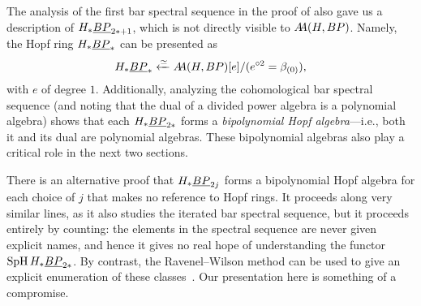\begin{remark}
The analysis of the first bar spectral sequence in the proof of  also gave us a description of \(H_* \OS{BP}{2*+1}\), which is not directly visible to \(\AA(H, BP)\).  Namely, the Hopf ring \(H_* \OS{BP}{*}\) can be presented as \[H_* \OS{BP}{*} \xleftarrow{\simeq} \AA(H, BP)[e] / (e^{\circ 2} = \beta_{(0)}),\] with \(e\) of degree \(1\).  Additionally, analyzing the cohomological bar spectral sequence (and noting that the dual of a divided power algebra is a polynomial algebra) shows that each \(H_* \OS{BP}{2*}\) forms a \textit{bipolynomial Hopf algebra}---i.e., both it and its dual are polynomial algebras.  These bipolynomial algebras also play a critical role in the next two sections.
\end{remark}

\begin{remark}
There is an alternative proof that \(H_* \OS{BP}{2j}\) forms a bipolynomial Hopf algebra for each choice of \(j\) that makes no reference to Hopf rings.  It proceeds along very similar lines, as it also studies the iterated bar spectral sequence, but it proceeds entirely by counting: the elements in the spectral sequence are never given explicit names, and hence it gives no real hope of understanding the functor \(\SpH H_* \OS{BP}{2*}\).  By contrast, the Ravenel--Wilson method can be used to give an explicit enumeration of these classes~\cite[Section 5]{RavenelWilsonHopfRingForMU}.  Our presentation here is something of a compromise.
\end{remark}


